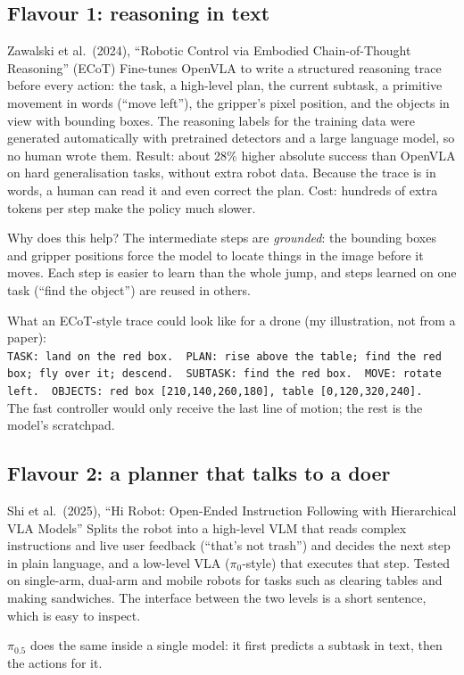 \subsection{Flavour 1: reasoning in text}
\begin{paperbox}{Zawalski et al.\ (2024), ``Robotic Control via Embodied Chain-of-Thought Reasoning'' (ECoT)}
Fine-tunes OpenVLA to write a structured reasoning trace before every action: the task, a high-level plan, the current subtask, a primitive movement in words (``move left''), the gripper's pixel position, and the objects in view with bounding boxes. The reasoning labels for the training data were generated automatically with pretrained detectors and a large language model, so no human wrote them. Result: about 28\% higher absolute success than OpenVLA on hard generalisation tasks, without extra robot data. Because the trace is in words, a human can read it and even correct the plan. Cost: hundreds of extra tokens per step make the policy much slower.
\end{paperbox}

Why does this help? The intermediate steps are \emph{grounded}: the bounding boxes and gripper positions force the model to locate things in the image before it moves. Each step is easier to learn than the whole jump, and steps learned on one task (``find the object'') are reused in others.

\begin{examplebox}
What an ECoT-style trace could look like for a drone (my illustration, not from a paper):\\[2pt]
\texttt{TASK: land on the red box.\ \ PLAN: rise above the table; find the red box; fly over it; descend.\ \ SUBTASK: find the red box.\ \ MOVE: rotate left.\ \ OBJECTS: red box [210,140,260,180], table [0,120,320,240].}\\[2pt]
The fast controller would only receive the last line of motion; the rest is the model's scratchpad.
\end{examplebox}

\subsection{Flavour 2: a planner that talks to a doer}
\begin{paperbox}{Shi et al.\ (2025), ``Hi Robot: Open-Ended Instruction Following with Hierarchical VLA Models''}
Splits the robot into a high-level VLM that reads complex instructions and live user feedback (``that's not trash'') and decides the next step in plain language, and a low-level VLA ($\pi_0$-style) that executes that step. Tested on single-arm, dual-arm and mobile robots for tasks such as clearing tables and making sandwiches. The interface between the two levels is a short sentence, which is easy to inspect.
\end{paperbox}
$\pi_{0.5}$ does the same inside a single model: it first predicts a subtask in text, then the actions for it.

